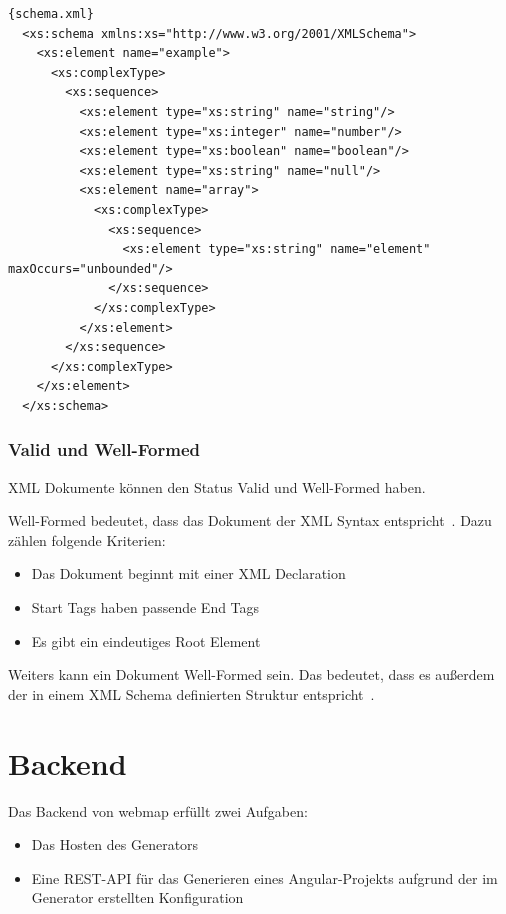 \begin{lstlisting}[label={lst:schema.xml}]{schema.xml}
  <xs:schema xmlns:xs="http://www.w3.org/2001/XMLSchema">
    <xs:element name="example">
      <xs:complexType>
        <xs:sequence>
          <xs:element type="xs:string" name="string"/>
          <xs:element type="xs:integer" name="number"/>
          <xs:element type="xs:boolean" name="boolean"/>
          <xs:element type="xs:string" name="null"/>
          <xs:element name="array">
            <xs:complexType>
              <xs:sequence>
                <xs:element type="xs:string" name="element" maxOccurs="unbounded"/>
              </xs:sequence>
            </xs:complexType>
          </xs:element>
        </xs:sequence>
      </xs:complexType>
    </xs:element>
  </xs:schema>
\end{lstlisting}

\subsubsection{Valid und Well-Formed}
XML Dokumente können den Status Valid und Well-Formed haben.

Well-Formed bedeutet, dass das Dokument der XML Syntax entspricht~\cite{xml-schema}.
Dazu zählen folgende Kriterien:

\begin{itemize}
  \item Das Dokument beginnt mit einer XML Declaration
  \item Start Tags haben passende End Tags
  \item Es gibt ein eindeutiges Root Element
\end{itemize}

Weiters kann ein Dokument Well-Formed sein.
Das bedeutet, dass es außerdem der in einem XML Schema definierten Struktur entspricht~\cite{xml}.

\section{Backend}
Das Backend von webmap erfüllt zwei Aufgaben:

\begin{itemize}
    \item Das Hosten des Generators
    \item Eine REST-API für das Generieren eines Angular-Projekts aufgrund der im Generator erstellten Konfiguration
\end{itemize}

